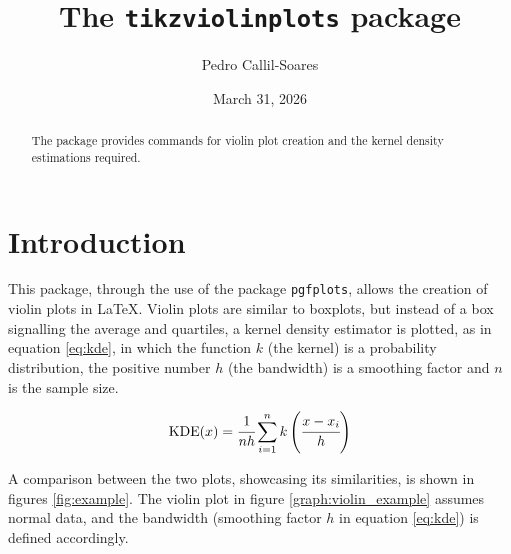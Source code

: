 \documentclass{article}
\title{The \texttt{tikzviolinplots} package}
\author{Pedro Callil-Soares}
\date{March 31, 2026}
\begin{document}
\maketitle

\tableofcontents

\begin{abstract}
	The package provides commands for violin plot creation and
	the kernel density estimations required.
\end{abstract}

\section{Introduction}

This package, through the use of the package \texttt{pgfplots}, allows the
creation of violin plots in \LaTeX. Violin plots are similar to boxplots,
but instead of a box signalling the average and quartiles, a kernel density
estimator is plotted, as in equation \ref{eq:kde}, in which the function $k$
(the kernel) is a probability distribution, the positive number $h$ (the
bandwidth) is a smoothing factor and $n$ is the sample size.

\begin{equation}
	\label{eq:kde}
	\textnormal{KDE}(x) = %
	\cfrac{1}{nh}\sum_{i=1}^nk\left(\cfrac{x-x_i}{h}\right)
\end{equation}

A comparison between the two plots, showcasing its similarities, is
shown in figures \ref{fig:example}. The violin plot in figure
\ref{graph:violin_example} assumes normal data, and the bandwidth
(smoothing factor $h$ in equation \ref{eq:kde}) is defined accordingly.

\end{document}
